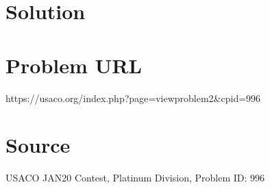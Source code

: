 \documentclass[12pt]{article}
\begin{document}
\section*{Solution}


\section*{Problem URL}
https://usaco.org/index.php?page=viewproblem2&cpid=996

\section*{Source}
USACO JAN20 Contest, Platinum Division, Problem ID: 996
\end{document}
